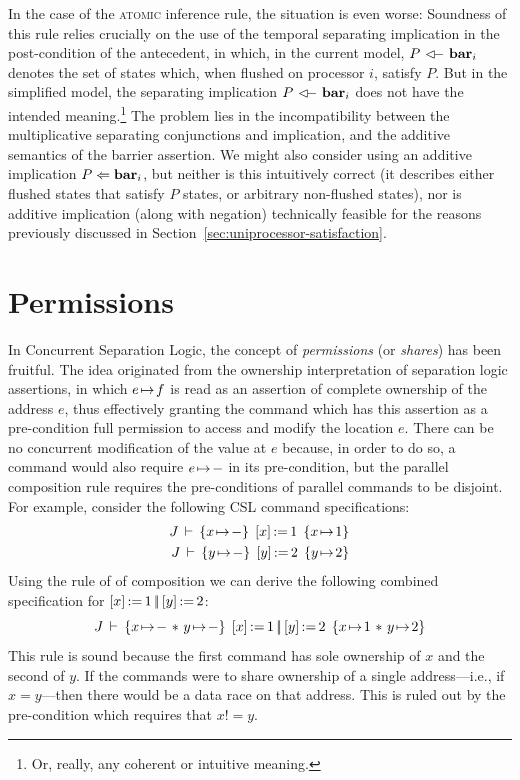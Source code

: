 \documentclass[11pt]{report}         %
\begin{document}
In the case of the \textsc{atomic} inference rule, the situation is even worse:  Soundness of this rule relies crucially on the use of the temporal separating implication in the post-condition of the antecedent, in which, in the current model, $P \fseqri \fbar{i}$ denotes the set of states which, when flushed on processor $i$, satisfy $P$. But in the simplified model, the separating implication $P \fseqri \fbar{i}$ does not have the intended meaning.\footnote{Or, really, any coherent or intuitive meaning.} The problem lies in the  incompatibility between the multiplicative separating conjunctions and implication, and the additive semantics of the barrier assertion. We might also consider using an additive implication $P \Leftarrow \mathbf{bar}_{i}$, but neither is this intuitively correct (it describes either flushed states that satisfy $P$ states, or arbitrary non-flushed states), nor is additive implication (along with negation) technically feasible for the reasons previously discussed in Section~\ref{sec:uniprocessor-satisfaction}. 

\section{Permissions} 
\label{sec:permissions}

In Concurrent Separation Logic, the concept of \emph{permissions} (or \emph{shares}) has been fruitful. The idea originated from the ownership interpretation of separation logic assertions, in which $e \!\mapsto\! f$ is read as an assertion of complete ownership of the address $e$, thus effectively granting the command which has this assertion as a pre-condition full permission to access and modify the location $e$. There can be no concurrent modification of the value at $e$ because, in order to do so, a command would also require $e \!\mapsto\! -$ in its pre-condition, but the parallel composition rule requires the pre-conditions of parallel commands to be disjoint. For example, consider the following CSL command specifications: \begin{align*}
  \spec{J}{x \fpointsto -}{\cstore{x}{1}}{x \fpointsto 1} \\ 
  \spec{J}{y \fpointsto -}{\cstore{y}{2}}{y \fpointsto 2}
\end{align*}Using the rule of of composition we can derive the following combined specification for $\left[ x \right] \operatorname{:\!=} 1 \operatorname{|\!|} \left[ y \right] \operatorname{:\!=} 2$: \[ \spec{J}{x \fpointsto - \fsep y \fpointsto -}{\cstore{x}{1} \oppar \cstore{y}{2}}{x \fpointsto 1 \fsep y \fpointsto 2} \] This rule is sound because the first command has sole ownership of $x$ and the second of $y$. If the commands were to share ownership of a single address---i.e., if $x = y$---then there would be a data race on that address. This is ruled out by the pre-condition which requires that $x != y$. 
\end{document}
